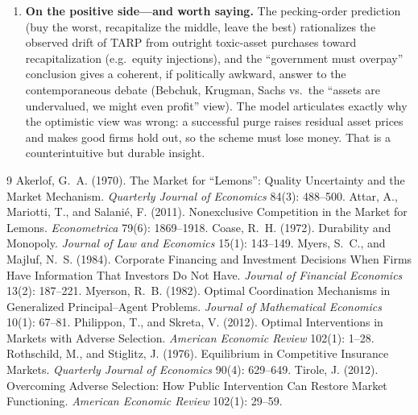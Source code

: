 \documentclass[11pt]{article}
\theoremstyle{definition}
\theoremstyle{plain}
\begin{document}
\begin{enumerate}[leftmargin=1.6em]
  \item \textbf{On the positive side---and worth saying.} The pecking-order
  prediction (buy the worst, recapitalize the middle, leave the best) rationalizes
  the observed drift of TARP from outright toxic-asset purchases toward
  recapitalization (e.g.\ equity injections), and the ``government must overpay''
  conclusion gives a coherent, if politically awkward, answer to the contemporaneous
  debate (Bebchuk, Krugman, Sachs vs.\ the ``assets are undervalued, we might even
  profit'' view). The model articulates exactly why the optimistic view was wrong:
  a successful purge raises residual asset prices and makes good firms hold out, so
  the scheme must lose money. That is a counterintuitive but durable insight.
\end{enumerate}

\begin{thebibliography}{9}
\small
{} Akerlof, G.~A. (1970). The Market for ``Lemons'':
Quality Uncertainty and the Market Mechanism. \emph{Quarterly Journal of
Economics} 84(3): 488--500.
 Attar, A., Mariotti, T., and Salani\'e, F. (2011).
Nonexclusive Competition in the Market for Lemons. \emph{Econometrica} 79(6):
1869--1918.
 Coase, R.~H. (1972). Durability and Monopoly. \emph{Journal
of Law and Economics} 15(1): 143--149.
 Myers, S.~C., and Majluf, N.~S. (1984). Corporate Financing and
Investment Decisions When Firms Have Information That Investors Do Not Have.
\emph{Journal of Financial Economics} 13(2): 187--221.
 Myerson, R.~B. (1982). Optimal Coordination Mechanisms in
Generalized Principal--Agent Problems. \emph{Journal of Mathematical Economics}
10(1): 67--81.
 Philippon, T., and Skreta, V. (2012). Optimal Interventions in
Markets with Adverse Selection. \emph{American Economic Review} 102(1): 1--28.
 Rothschild, M., and Stiglitz, J. (1976). Equilibrium in
Competitive Insurance Markets. \emph{Quarterly Journal of Economics} 90(4):
629--649.
 Tirole, J. (2012). Overcoming Adverse Selection: How Public
Intervention Can Restore Market Functioning. \emph{American Economic Review}
102(1): 29--59.
\end{thebibliography}
\end{document}

